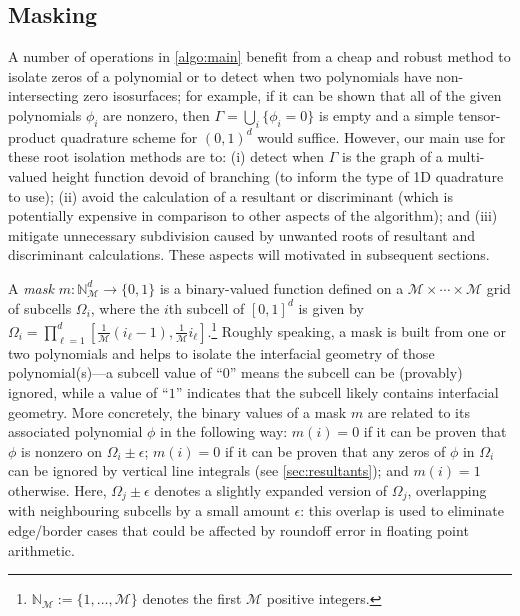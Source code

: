 \documentclass[onefignum,onetabnum,onealgnum,oneeqnum]{siamart190516}
\begin{document}
%
%


\subsection{Masking}
\label{sec:masks}

A number of operations in \cref{algo:main} benefit from a cheap and robust method to isolate zeros of a polynomial or to detect when two polynomials have non-intersecting zero isosurfaces; for example, if it can be shown that all of the given polynomials $\phi_i$ are nonzero, then $\Gamma = \bigcup_i \{\phi_i = 0\}$ is empty and a simple tensor-product quadrature scheme for $(0,1)^d$ would suffice. However, our main use for these root isolation methods are to: (i) detect when $\Gamma$ is the graph of a multi-valued height function devoid of branching (to inform the type of 1D quadrature to use); (ii) avoid the calculation of a resultant or discriminant (which is potentially expensive in comparison to other aspects of the algorithm); and (iii) mitigate unnecessary subdivision caused by unwanted roots of resultant and discriminant calculations. These aspects will motivated in subsequent sections. %

A \textit{mask} $m : {\mathbb N}_{\mathcal M}^d \to \{0,1\}$ is a binary-valued function defined on a $\mathcal M \times \cdots \times \mathcal M$ grid of subcells $\Omega_i$, where the $i$th subcell of $[0,1]^d$ is given by $\Omega_i = \prod_{\ell=1}^d [\tfrac{1}{\mathcal M} (i_\ell - 1),\tfrac{1}{\mathcal M} i_\ell]$.\footnote{${\mathbb N}_{\mathcal M} := \{1, \ldots, {\mathcal M}\}$ denotes the first $\mathcal M$ positive integers.} Roughly speaking, a mask is built from one or two polynomials and helps to isolate the interfacial geometry of those polynomial(s)---a subcell value of ``$0$'' means the subcell can be (provably) ignored, while a value of ``$1$'' indicates that the subcell likely contains interfacial geometry. More concretely, the binary values of a mask $m$ are related to its associated polynomial $\phi$ in the following way: $m(i) = 0$ if it can be proven that $\phi$ is nonzero on $\Omega_i \pm \epsilon$; $m(i) = 0$ if it can be proven that any zeros of $\phi$ in $\Omega_i$ can be ignored by vertical line integrals (see \cref{sec:resultants}); and $m(i) = 1$ otherwise. Here, $\Omega_j \pm \epsilon$ denotes a slightly expanded version of $\Omega_j$, overlapping with neighbouring subcells by a small amount $\epsilon$: this overlap is used to eliminate edge/border cases that could be affected by roundoff error in floating point arithmetic.
\end{document}
